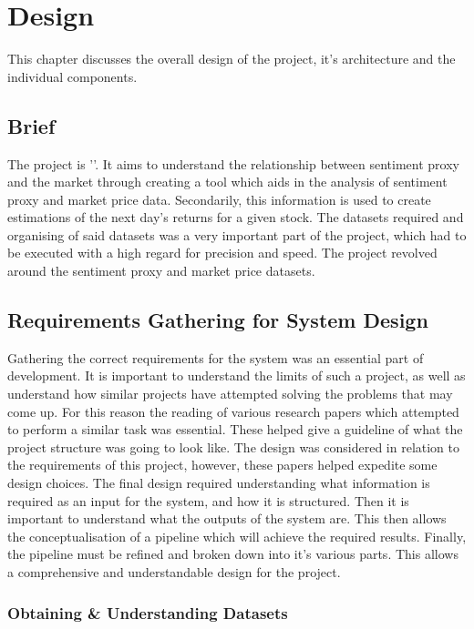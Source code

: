 
\chapter{Design}

This chapter discusses the overall design of the project, it's architecture and the individual components.

\section{Brief}

The project is '\thesistitle'. It aims to understand the relationship between sentiment proxy and the market through creating a tool which aids in the analysis of sentiment proxy and market price data. Secondarily, this information is used to create estimations of the next day's returns for a given stock. The datasets required and organising of said datasets was a very important part of the project, which had to be executed with a high regard for precision and speed. The project revolved around the sentiment proxy and market price datasets.

\section{Requirements Gathering for System Design}

Gathering the correct requirements for the system was an essential part of development. It is important to understand the limits of such a project, as well as understand how similar projects have attempted solving the problems that may come up. For this reason the reading of various research papers which attempted to perform a similar task was essential. These helped give a guideline of what the project structure was going to look like. The design was considered in relation to the requirements of this project, however, these papers helped expedite some design choices. The final design required understanding what information is required as an input for the system, and how it is structured. Then it is important to understand what the outputs of the system are. This then allows the conceptualisation of a pipeline which will achieve the required results. Finally, the pipeline must be refined and broken down into it's various parts. This allows a comprehensive and understandable design for the project.

\subsection{Obtaining \& Understanding Datasets}

